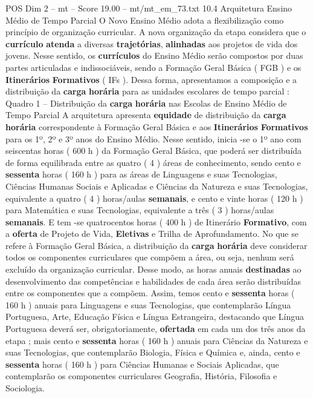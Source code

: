 \begin{textsample}{POS Dim 2 – mt – Score 19.00 – mt/mt\_em\_73.txt}  \label{ex:f2_pos_229}
10.4 Arquitetura Ensino Médio de Tempo Parcial O Novo Ensino Médio adota a flexibilização como princípio de organização curricular.
A nova organização da etapa considera que o \textbf{currículo} \textbf{atenda} a diversas \textbf{trajetórias}, \textbf{alinhadas} aos projetos de vida dos jovens.
Nesse sentido, os \textbf{currículos} do Ensino Médio serão compostos por duas partes articuladas e indissociáveis, sendo a Formação Geral Básica ( FGB ) e os \textbf{Itinerários} \textbf{Formativos} ( IFs ).
Dessa forma, apresentamos a composição e a distribuição da \textbf{carga} \textbf{horária} para as unidades escolares de tempo parcial : Quadro 1 – Distribuição da \textbf{carga} \textbf{horária} nas Escolas de Ensino Médio de Tempo Parcial A arquitetura apresenta \textbf{equidade} de distribuição da \textbf{carga} \textbf{horária} correspondente à Formação Geral Básica e aos \textbf{Itinerários} \textbf{Formativos} para os 1º, 2º e 3º anos do Ensino Médio.
Nesse sentido, inicia -se o 1º ano com seiscentas horas ( 600 h ) da Formação Geral Básica, que poderá ser distribuída de forma equilibrada entre as quatro ( 4 ) áreas de conhecimento, sendo cento e \textbf{sessenta} horas ( 160 h ) para as áreas de Linguagens e suas Tecnologias, Ciências Humanas Sociais e Aplicadas e Ciências da Natureza e suas Tecnologias, equivalente a quatro ( 4 ) horas/aulas \textbf{semanais}, e cento e vinte horas ( 120 h ) para Matemática e suas Tecnologias, equivalente a três ( 3 ) horas/aulas \textbf{semanais}.
E tem -se quatrocentos horas ( 400 h ) de Itinerário \textbf{Formativo}, com a \textbf{oferta} de Projeto de Vida, \textbf{Eletivas} e Trilha de Aprofundamento.
No que se refere à Formação Geral Básica, a distribuição da \textbf{carga} \textbf{horária} deve considerar todos os componentes curriculares que compõem a área, ou seja, nenhum será excluído da organização curricular.
Desse modo, as horas anuais \textbf{destinadas} ao desenvolvimento das competências e habilidades de cada área serão distribuídas entre os componentes que a compõem.
Assim, temos cento e \textbf{sessenta} horas ( 160 h ) anuais para Linguagens e suas Tecnologias, que contemplarão Língua Portuguesa, Arte, Educação Física e Língua Estrangeira, destacando que Língua Portuguesa deverá ser, obrigatoriamente, \textbf{ofertada} em cada um dos três anos da etapa ; mais cento e \textbf{sessenta} horas ( 160 h ) anuais para Ciências da Natureza e suas Tecnologias, que contemplarão Biologia, Física e Química e, ainda, cento e \textbf{sessenta} horas ( 160 h ) para Ciências Humanas e Sociais Aplicadas, que contemplarão os componentes curriculares Geografia, História, Filosofia e Sociologia.

\end{textsample}
